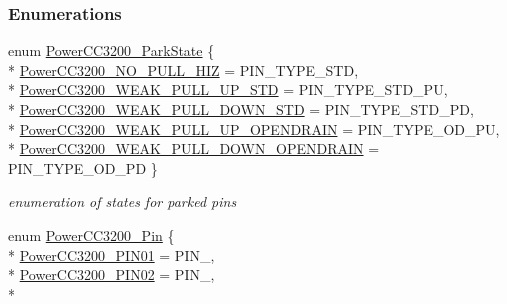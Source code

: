 \subsubsection*{Enumerations}
\begin{DoxyCompactItemize}
\item 
enum \hyperlink{_power_c_c3200_8h_a352553cc06ecc6b8344d271bd27a0975}{Power\+C\+C3200\+\_\+\+Park\+State} \{ \\*
\hyperlink{_power_c_c3200_8h_a352553cc06ecc6b8344d271bd27a0975a6a5c7ec18bde03dd354b71b3f5b11607}{Power\+C\+C3200\+\_\+\+N\+O\+\_\+\+P\+U\+L\+L\+\_\+\+H\+I\+Z} = P\+I\+N\+\_\+\+T\+Y\+P\+E\+\_\+\+S\+T\+D, 
\\*
\hyperlink{_power_c_c3200_8h_a352553cc06ecc6b8344d271bd27a0975a2e867155c501c32027642e587b42f827}{Power\+C\+C3200\+\_\+\+W\+E\+A\+K\+\_\+\+P\+U\+L\+L\+\_\+\+U\+P\+\_\+\+S\+T\+D} = P\+I\+N\+\_\+\+T\+Y\+P\+E\+\_\+\+S\+T\+D\+\_\+\+P\+U, 
\\*
\hyperlink{_power_c_c3200_8h_a352553cc06ecc6b8344d271bd27a0975a29104a99882652e257c805b53121dedd}{Power\+C\+C3200\+\_\+\+W\+E\+A\+K\+\_\+\+P\+U\+L\+L\+\_\+\+D\+O\+W\+N\+\_\+\+S\+T\+D} = P\+I\+N\+\_\+\+T\+Y\+P\+E\+\_\+\+S\+T\+D\+\_\+\+P\+D, 
\\*
\hyperlink{_power_c_c3200_8h_a352553cc06ecc6b8344d271bd27a0975aee7a9bfc6fbe37ad41598c76a999a936}{Power\+C\+C3200\+\_\+\+W\+E\+A\+K\+\_\+\+P\+U\+L\+L\+\_\+\+U\+P\+\_\+\+O\+P\+E\+N\+D\+R\+A\+I\+N} = P\+I\+N\+\_\+\+T\+Y\+P\+E\+\_\+\+O\+D\+\_\+\+P\+U, 
\\*
\hyperlink{_power_c_c3200_8h_a352553cc06ecc6b8344d271bd27a0975a0f975e383b8967d11fbdd5addb97bb61}{Power\+C\+C3200\+\_\+\+W\+E\+A\+K\+\_\+\+P\+U\+L\+L\+\_\+\+D\+O\+W\+N\+\_\+\+O\+P\+E\+N\+D\+R\+A\+I\+N} = P\+I\+N\+\_\+\+T\+Y\+P\+E\+\_\+\+O\+D\+\_\+\+P\+D
 \}
\begin{DoxyCompactList}\small\item\em enumeration of states for parked pins \end{DoxyCompactList}\item 
enum \hyperlink{_power_c_c3200_8h_a8b2018d283cb1a67825bd8dc13559536}{Power\+C\+C3200\+\_\+\+Pin} \{ \\*
\hyperlink{_power_c_c3200_8h_a8b2018d283cb1a67825bd8dc13559536aff4adc2235027862ef617e8029a434eb}{Power\+C\+C3200\+\_\+\+P\+I\+N01} = P\+I\+N\+\_, 
\\*
\hyperlink{_power_c_c3200_8h_a8b2018d283cb1a67825bd8dc13559536a5a6584677486acbc9e7e24cd6abb5e55}{Power\+C\+C3200\+\_\+\+P\+I\+N02} = P\+I\+N\+\_, 
\\*

\end{DoxyCompactItemize}
